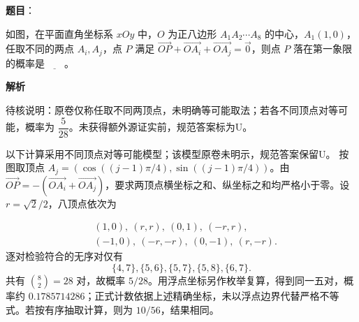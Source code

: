 \begin{answer}

\textbf{题目}：

如图，在平面直角坐标系 \(xOy\) 中，\(O\) 为正八边形 \(A_1A_2\cdots A_8\) 的中心，\(A_1(1,0)\)，任取不同的两点 \(A_i,A_j\)，点 \(P\) 满足 \(\overrightarrow{OP}+\overrightarrow{OA_i}+\overrightarrow{OA_j}=\vec{0}\)，则点 \(P\) 落在第一象限的概率是\(\underline{\qquad}\)。
\nopagebreak[4]
\begin{center}\end{center}
\nopagebreak[4]
\textbf{解析}

待核说明：原卷仅称任取不同两顶点，未明确等可能取法；若各不同顶点对等可能，概率为 \(\dfrac{5}{28}\)。未获得额外源证实前，规范答案标为U。

以下计算采用不同顶点对等可能模型；该模型原卷未明示，规范答案保留U。
按图取顶点 \(A_j=(\cos((j-1)\pi/4),\sin((j-1)\pi/4))\)。由 \(\overrightarrow{OP}=-(\overrightarrow{OA_i}+\overrightarrow{OA_j})\)，要求两顶点横坐标之和、纵坐标之和均严格小于零。设 \(r=\sqrt2/2\)，八顶点依次为 

\nopagebreak[4]
\[
\begin{aligned}
&(1,0),\ (r,r),\ (0,1),\ (-r,r),\\
&(-1,0),\ (-r,-r),\ (0,-1),\ (r,-r).
\end{aligned}
\]
逐对检验符合的无序对仅有
\nopagebreak[4]
\[
\{4,7\},\{5,6\},\{5,7\},\{5,8\},\{6,7\}.
\]
共有 \(\binom82=28\) 对，故概率 \(5/28\)。用浮点坐标另作枚举复算，得到同一五对，概率约 \(0.1785714286\)；正式计数依据上述精确坐标，未以浮点边界代替严格不等式。若按有序抽取计算，则为 \(10/56\)，结果相同。


\end{answer}

